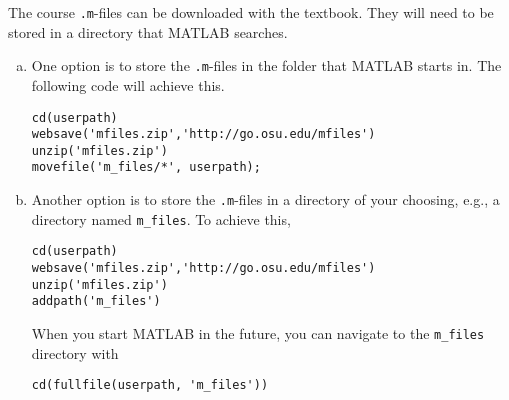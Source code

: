 \documentclass{article}
\begin{document}
The course \texttt{.m}-files can be downloaded with the textbook.
They will need to be stored in a directory that MATLAB searches.

\begin{enumerate}[(a)]
\item One option is to store the \texttt{.m}-files in the folder that MATLAB
  starts in.  The following code will achieve this.
  
\begin{verbatim}
cd(userpath)
websave('mfiles.zip','http://go.osu.edu/mfiles')
unzip('mfiles.zip')
movefile('m_files/*', userpath);
\end{verbatim}
  
\item Another option is to store the \texttt{.m}-files in a directory of your choosing, e.g., a directory named \verb|m_files|.  To achieve this,
\begin{verbatim}
cd(userpath)
websave('mfiles.zip','http://go.osu.edu/mfiles')
unzip('mfiles.zip')
addpath('m_files')
\end{verbatim}
When you start MATLAB in the future, you can navigate to the \verb|m_files| directory with 
\begin{verbatim}
cd(fullfile(userpath, 'm_files'))
\end{verbatim}

\end{enumerate}
\end{document}
